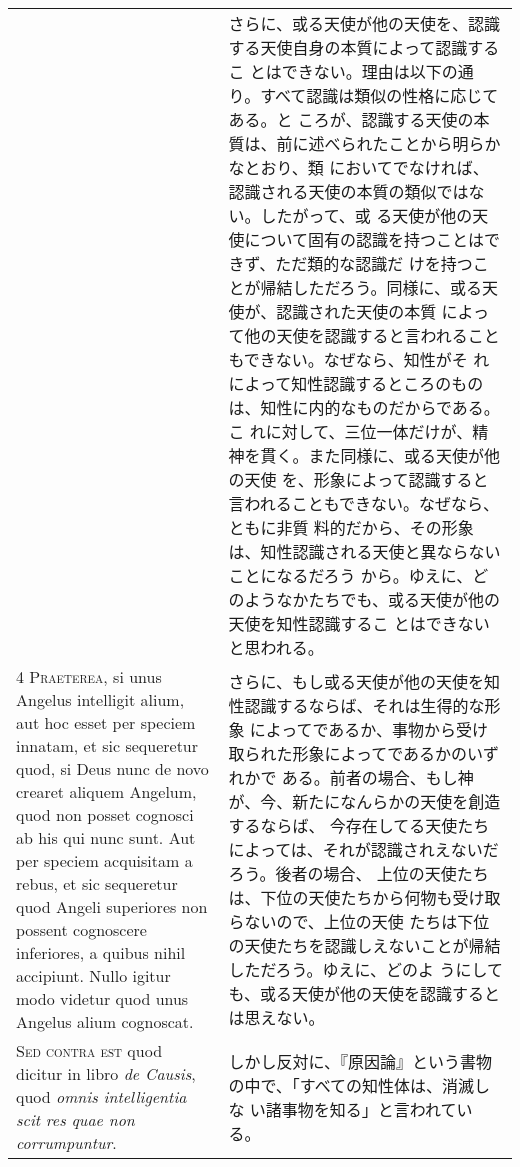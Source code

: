 \documentclass[10pt]{jsarticle} %
\begin{document}
\begin{longtable}{p{21em}p{21em}}
&

さらに、或る天使が他の天使を、認識する天使自身の本質によって認識するこ
とはできない。理由は以下の通り。すべて認識は類似の性格に応じてある。と
ころが、認識する天使の本質は、前に述べられたことから明らかなとおり、類
においてでなければ、認識される天使の本質の類似ではない。したがって、或
る天使が他の天使について固有の認識を持つことはできず、ただ類的な認識だ
けを持つことが帰結しただろう。同様に、或る天使が、認識された天使の本質
によって他の天使を認識すると言われることもできない。なぜなら、知性がそ
れによって知性認識するところのものは、知性に内的なものだからである。こ
れに対して、三位一体だけが、精神を貫く。また同様に、或る天使が他の天使
を、形象によって認識すると言われることもできない。なぜなら、ともに非質
料的だから、その形象は、知性認識される天使と異ならないことになるだろう
から。ゆえに、どのようなかたちでも、或る天使が他の天使を知性認識するこ
とはできないと思われる。

\\


{\scshape 4 Praeterea}, si unus Angelus intelligit alium, aut hoc
esset per speciem innatam, et sic sequeretur quod, si Deus nunc de
novo crearet aliquem Angelum, quod non posset cognosci ab his qui nunc
sunt. Aut per speciem acquisitam a rebus, et sic sequeretur quod
Angeli superiores non possent cognoscere inferiores, a quibus nihil
accipiunt. Nullo igitur modo videtur quod unus Angelus alium
cognoscat.


&

さらに、もし或る天使が他の天使を知性認識するならば、それは生得的な形象
によってであるか、事物から受け取られた形象によってであるかのいずれかで
ある。前者の場合、もし神が、今、新たになんらかの天使を創造するならば、
今存在してる天使たちによっては、それが認識されえないだろう。後者の場合、
上位の天使たちは、下位の天使たちから何物も受け取らないので、上位の天使
たちは下位の天使たちを認識しえないことが帰結しただろう。ゆえに、どのよ
うにしても、或る天使が他の天使を認識するとは思えない。

\\


{\scshape Sed contra est} quod dicitur in libro {\itshape de Causis},
quod {\itshape omnis intelligentia scit res quae non corrumpuntur}.


&

しかし反対に、『原因論』という書物の中で、「すべての知性体は、消滅しな
い諸事物を知る」と言われている。


\\



\end{longtable}
\end{document}
